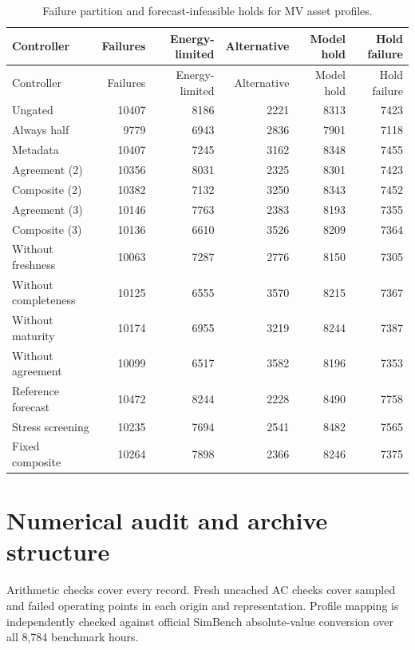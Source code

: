 \documentclass[11pt]{article}
\begin{document}
\small\begin{longtable}{lrrrrr}
\caption{Failure partition and forecast-infeasible holds for MV asset profiles.}\\\toprule
Controller & Failures & Energy-limited & Alternative & Model hold & Hold failure\\\midrule
\endfirsthead
\toprule
Controller & Failures & Energy-limited & Alternative & Model hold & Hold failure\\\midrule
\endhead
\bottomrule\endfoot
Ungated & 10407 & 8186 & 2221 & 8313 & 7423\\
Always half & 9779 & 6943 & 2836 & 7901 & 7118\\
Metadata & 10407 & 7245 & 3162 & 8348 & 7455\\
Agreement (2) & 10356 & 8031 & 2325 & 8301 & 7423\\
Composite (2) & 10382 & 7132 & 3250 & 8343 & 7452\\
Agreement (3) & 10146 & 7763 & 2383 & 8193 & 7355\\
Composite (3) & 10136 & 6610 & 3526 & 8209 & 7364\\
Without freshness & 10063 & 7287 & 2776 & 8150 & 7305\\
Without completeness & 10125 & 6555 & 3570 & 8215 & 7367\\
Without maturity & 10174 & 6955 & 3219 & 8244 & 7387\\
Without agreement & 10099 & 6517 & 3582 & 8196 & 7353\\
Reference forecast & 10472 & 8244 & 2228 & 8490 & 7758\\
Stress screening & 10235 & 7694 & 2541 & 8482 & 7565\\
Fixed composite & 10264 & 7898 & 2366 & 8246 & 7375\\
\end{longtable}\normalsize
\section{Numerical audit and archive structure}
Arithmetic checks cover every record. Fresh uncached AC checks cover sampled and failed operating points in each origin and representation. Profile mapping is independently checked against official SimBench absolute-value conversion over all 8,784 benchmark hours.
\end{document}
